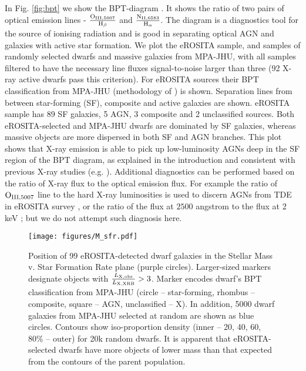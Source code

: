 \documentclass[fleqn,usenatbib]{mnras}
\newcommand{\lxlxrbrat}{\frac{L_{\rm X, obs}}{L_{\rm X, XRB}}}
\begin{document}
In Fig. \ref{fig:bpt} we show the BPT-diagram \citep{Baldwin1981}. It shows the ratio of two pairs of optical emission lines - $\rm \frac{O_{III, 5007}}{H_{\beta}}$ and $\rm \frac{N_{II, 6583}}{H_{\alpha}}$. The diagram is a diagnostics tool for the source of ionising radiation and is good in separating optical AGN and galaxies with active star formation. We plot the eROSITA sample, and samples of randomly selected dwarfs and massive galaxies from MPA-JHU, with all samples filtered to have the necessary line fluxes signal-to-noise larger than three (92 X-ray active dwarfs pass this criterion). For eROSITA sources their BPT classification from MPA-JHU (methodology of \citealt{Brinchmann2004}) is shown. Separation lines from \citealt{Kewley2001, Kauffmann2003b} between star-forming (SF), composite and active galaxies are shown. eROSITA sample has 89 SF galaxies, 5 AGN, 3 composite and 2 unclassified sources. Both eROSITA-selected and MPA-JHU dwarfs are dominated by SF galaxies, whereas massive objects are more dispersed in both SF and AGN branches. This plot shows that X-ray emission is able to pick up low-luminosity AGNs deep in the SF region of the BPT diagram, as explained in the introduction and consistent with previous X-ray studies (e.g. \citealt{Birchall2020}). Additional diagnostics can be performed based on the ratio of X-ray flux to the optical emission flux. For example the ratio of $\rm O_{ III, 5007}$ line to the hard X-ray luminosities is used to discern AGNs from TDE in eROSITA survey \citep{Khorunzhev2022}, or the ratio of the flux at $2500$ angstrom to the flux at 2 keV \citep{Birchall2020}; but we do not attempt such diagnosis here.




\begin{figure}
    \texttt{[image: figures/M\_sfr.pdf]}
    \caption[Dwarf galaxies stellar mass - star formation rate plane.]{Position of 99 eROSITA-detected dwarf galaxies in the Stellar Mass v. Star Formation Rate plane (purple circles). Larger-sized markers designate objects with $\lxlxrbrat>3$. Marker encodes dwarf's BPT classification from MPA-JHU (circle -- star-forming, rhombus -- composite, square -- AGN, unclassified -- X). In addition, 5000 dwarf galaxies from MPA-JHU selected at random are shown as blue circles. Contours show iso-proportion density (inner -- 20, 40, 60, 80\%  -- outer) for 20k random dwarfs. It is apparent that eROSITA-selected dwarfs have more objects of lower mass than that expected from the contours of the parent population.}
    \label{fig:M_sfr}
\end{figure}
\end{document}
